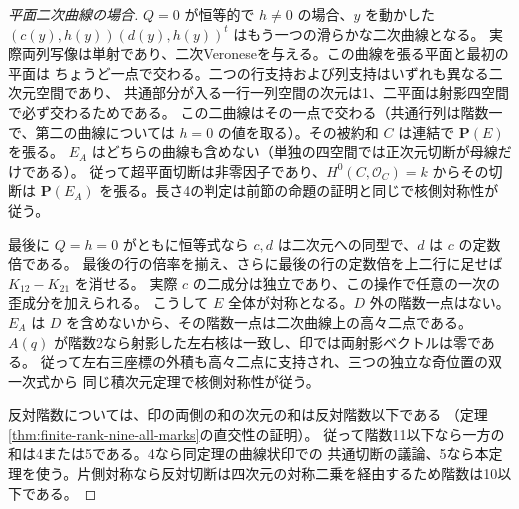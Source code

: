 \begin{proof}[平面二次曲線の場合]
$Q=0$ が恒等的で $h\ne0$ の場合、$y$ を動かした
$(c(y),h(y))(d(y),h(y))^t$ はもう一つの滑らかな二次曲線となる。
実際両列写像は単射であり、二次Veroneseを与える。この曲線を張る平面と最初の平面は
ちょうど一点で交わる。二つの行支持および列支持はいずれも異なる二次元空間であり、
共通部分が入る一行一列空間の次元は1、二平面は射影四空間で必ず交わるためである。
この二曲線はその一点で交わる（共通行列は階数一で、第二の曲線については
$h=0$ の値を取る）。その被約和 $C$ は連結で $\mathbf P(E)$ を張る。
$E_A$ はどちらの曲線も含めない（単独の四空間では正次元切断が母線だけである）。
従って超平面切断は非零因子であり、$H^0(C,\mathcal O_C)=k$ からその切断は
$\mathbf P(E_A)$ を張る。長さ4の判定は前節の命題の証明と同じで核側対称性が従う。

最後に $Q=h=0$ がともに恒等式なら $c,d$ は二次元への同型で、$d$ は $c$ の定数倍である。
最後の行の倍率を揃え、さらに最後の行の定数倍を上二行に足せば $K_{12}-K_{21}$ を消せる。
実際 $c$ の二成分は独立であり、この操作で任意の一次の歪成分を加えられる。
こうして $E$ 全体が対称となる。$D$ 外の階数一点はない。
$E_A$ は $D$ を含めないから、その階数一点は二次曲線上の高々二点である。
$A(q)$ が階数2なら射影した左右核は一致し、印では両射影ベクトルは零である。
従って左右三座標の外積も高々二点に支持され、三つの独立な奇位置の双一次式から
同じ積次元定理で核側対称性が従う。

反対階数については、印の両側の和の次元の和は反対階数以下である
（定理\ref{thm:finite-rank-nine-all-marks}の直交性の証明）。
従って階数11以下なら一方の和は4または5である。4なら同定理の曲線状印での
共通切断の議論、5なら本定理を使う。片側対称なら反対切断は四次元の対称二乗を経由するため階数は10以下である。
\end{proof}
